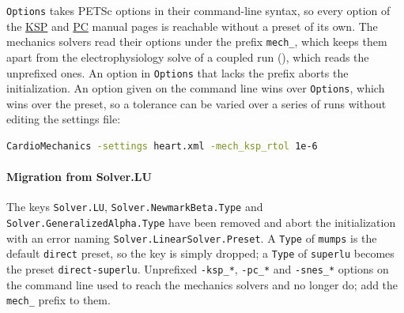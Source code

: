 \verb|Options| takes PETSc options in their command-line syntax, so every option of the \href{https://petsc.org/main/manualpages/KSP/}{KSP} and \href{https://petsc.org/main/manualpages/PC/}{PC} manual pages is reachable without a preset of its own.
The mechanics solvers read their options under the prefix \verb|mech_|, which keeps them apart from the electrophysiology solve of a coupled run (), which reads the unprefixed ones.
An option in \verb|Options| that lacks the prefix aborts the initialization.
An option given on the command line wins over \verb|Options|, which wins over the preset, so a tolerance can be varied over a series of runs without editing the settings file:
\begin{lstlisting}[language=bash,caption=Overriding a linear solver option on the command line]
CardioMechanics -settings heart.xml -mech_ksp_rtol 1e-6
\end{lstlisting}

\paragraph{Migration from Solver.LU}
The keys \verb|Solver.LU|, \verb|Solver.NewmarkBeta.Type| and \verb|Solver.GeneralizedAlpha.Type| have been removed and abort the initialization with an error naming \verb|Solver.LinearSolver.Preset|.
A \verb|Type| of \verb|mumps| is the default \verb|direct| preset, so the key is simply dropped; a \verb|Type| of \verb|superlu| becomes the preset \verb|direct-superlu|.
Unprefixed \verb|-ksp_*|, \verb|-pc_*| and \verb|-snes_*| options on the command line used to reach the mechanics solvers and no longer do; add the \verb|mech_| prefix to them.

